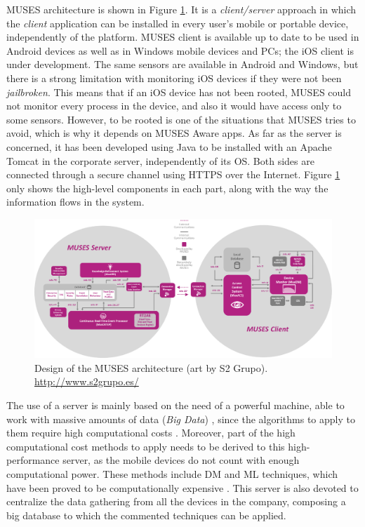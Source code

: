 MUSES architecture is shown in Figure \ref{fig:architecture}. It is a \textit{client/server} approach in which the \textit{client} application can be installed in every user's mobile or portable device, independently of the platform. MUSES client is available up to date to be used in Android devices as well as in Windows mobile devices and PCs; the iOS client is under development. The same sensors are available in Android and Windows, but there is a strong limitation with monitoring iOS devices if they were not been \textit{jailbroken}. This means that if an iOS device has not been rooted, MUSES could not monitor every process in the device, and also it would have access only to some sensors. However, to be rooted is one of the situations that MUSES tries to avoid, which is why it depends on MUSES Aware apps. As far as the server is concerned, it has been developed using Java to be installed with an Apache Tomcat in the corporate server, independently of its OS. Both sides are connected through a secure channel using HTTPS over the Internet. Figure \ref{fig:architecture} only shows the high-level components in each part, along with the way the information flows in the system.

\begin{figure}
\centering
 \includegraphics[scale =0.32] {gfx/byodSotA/architecture_modules.eps}
\caption{Design of the MUSES architecture (art by S2 Grupo).  \url{http://www.s2grupo.es/}}
\label{fig:architecture}
\end{figure}

The use of a server is mainly based on the need of a powerful machine, able to work with massive amounts of data (\textit{Big Data}) \cite{BigData_11}, since the algorithms to apply to them require high computational costs \cite{Shirkhorshidi14Review}.
Moreover, part of the high computational cost methods to apply needs to be derived to this high-performance server, as the mobile devices do not count with enough computational power. These methods include DM \cite{DataMining_Lee01} and ML \cite{MachineLearning_Bishop06} techniques, which have been proved to be computationally expensive \cite{Cios07DataMining}. This server is also devoted to centralize the data gathering from all the devices in the company, composing a big database to which the commented techniques can be applied.

